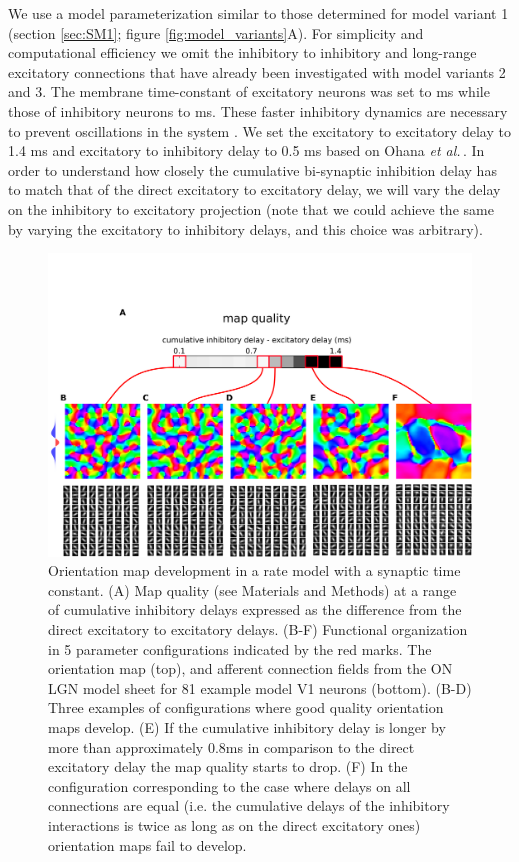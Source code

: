 \documentclass[utf8]{frontiersSCNS}
\newcommand{\etal}{\textit{et al.}}
\begin{document}
We use a model parameterization similar to those determined for 
model variant 1 (section \ref{sec:SM1}; figure \ref{fig:model_variants}A). For simplicity and computational efficiency we omit the inhibitory to inhibitory and long-range excitatory connections that have already been investigated with model variants 2 and 3. The membrane time-constant of excitatory neurons was set to ms while those of inhibitory neurons to ms. These faster inhibitory dynamics are necessary to prevent oscillations in the system \citep{Kang2003}. We set the excitatory to excitatory delay to 1.4 ms and excitatory to inhibitory delay to 0.5 ms based on Ohana \etal\,\citep{Ohana2012}. In order to understand how closely the 
cumulative bi-synaptic inhibition delay has to match that of the direct excitatory to excitatory delay, we will vary the delay on the inhibitory to excitatory projection (note that we could achieve the same by varying the excitatory
to inhibitory delays, and this choice was arbitrary). 
 
\begin{figure}[htpb!] 
\centering
\includegraphics[width=16cm]{./SVG/Figure4/figure4.png}
\caption{Orientation map development in a rate model with a synaptic time constant. (A) Map quality (see Materials and Methods) at a range of 
cumulative inhibitory delays expressed as the difference from the direct excitatory to excitatory delays. (B-F) Functional organization in 5 parameter configurations 
indicated by the red marks. The orientation map (top), and afferent connection fields from the ON LGN model sheet for 81 example model V1 neurons (bottom). 
(B-D) Three examples of configurations where good quality orientation maps develop. (E) If the cumulative inhibitory delay is longer by more than approximately 0.8ms in comparison
to the direct excitatory delay the map quality starts to drop. (F) In the configuration corresponding to the case where delays on all connections are equal (i.e. the cumulative delays
of the inhibitory interactions is twice as long as on the direct excitatory ones) orientation maps fail to develop.}
\label{fig:figure4}
\end{figure} 
\end{document}
